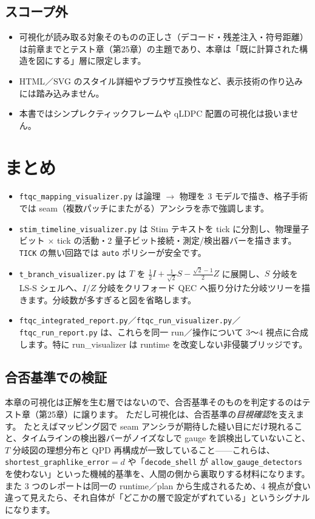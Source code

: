 \subsection{スコープ外}

\begin{itemize}
  \item 可視化が読み取る対象そのものの正しさ（デコード・残差注入・符号距離）は前章までとテスト章（第25章）の主題であり、本章は「既に計算された構造を図にする」層に限定します。
  \item HTML／SVG のスタイル詳細やブラウザ互換性など、表示技術の作り込みには踏み込みません。
  \item 本書ではシンプレクティックフレームや qLDPC 配置の可視化は扱いません。
\end{itemize}

\section{まとめ}\label{ch24:summary}

\begin{itemize}
  \item \texttt{ftqc\_mapping\_visualizer.py} は論理 $\to$ 物理を 3 モデルで描き、格子手術では seam（複数パッチにまたがる）アンシラを赤で強調します。
  \item \texttt{stim\_timeline\_visualizer.py} は Stim テキストを tick に分割し、物理量子ビット $\times$ tick の活動・2 量子ビット接続・測定/検出器バーを描きます。\texttt{TICK} の無い回路では \texttt{auto} ポリシーが安全です。
  \item \texttt{t\_branch\_visualizer.py} は $T$ を $\tfrac12 I + \tfrac{1}{\sqrt2}S - \tfrac{\sqrt2-1}{2}Z$ に展開し、$S$ 分岐を LS-S シェルへ、$I/Z$ 分岐をクリフォード QEC へ振り分けた分岐ツリーを描きます。分岐数が多すぎると図を省略します。
  \item \texttt{ftqc\_integrated\_report.py}／\texttt{ftqc\_run\_visualizer.py}／\texttt{ftqc\_run\_report.py} は、これらを同一 run／操作について 3〜4 視点に合成します。特に run\_visualizer は runtime を改変しない非侵襲ブリッジです。
\end{itemize}

\subsection*{合否基準での検証}

本章の可視化は正解を生む層ではないので、合否基準そのものを判定するのはテスト章（第25章）に譲ります。
ただし可視化は、合否基準の\emph{目視確認}を支えます。
たとえばマッピング図で seam アンシラが期待した縫い目にだけ現れること、タイムラインの検出器バーがノイズなしで gauge を誤検出していないこと、$T$ 分岐図の理想分布と QPD 再構成が一致していること——これらは、\texttt{shortest\_graphlike\_error}$=d$ や「\texttt{decode\_shell} が \texttt{allow\_gauge\_detectors} を使わない」といった機械的基準を、人間の側から裏取りする材料になります。
また 3 つのレポートは同一の runtime／plan から生成されるため、4 視点が食い違って見えたら、それ自体が「どこかの層で設定がずれている」というシグナルになります。

